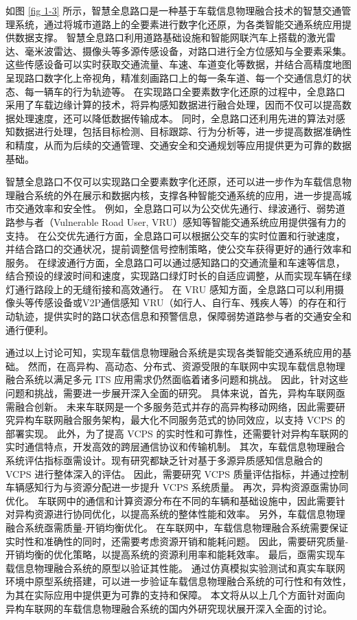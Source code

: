 如图 \ref{fig 1-3} 所示，智慧全息路口是一种基于车载信息物理融合技术的智慧交通管理系统，通过将城市道路上的全要素进行数字化还原，为各类智能交通系统应用提供数据支撑。
智慧全息路口利用道路基础设施和智能网联汽车上搭载的激光雷达、毫米波雷达、摄像头等多源传感设备，对路口进行全方位感知与全要素采集。
这些传感设备可以实时获取交通流量、车速、车道变化等数据，并结合高精度地图呈现路口数字化上帝视角，精准刻画路口上的每一条车道、每一个交通信息灯的状态、每一辆车的行为轨迹等。
在实现路口全要素数字化还原的过程中，全息路口采用了车载边缘计算的技术，将异构感知数据进行融合处理，因而不仅可以提高数据处理速度，还可以降低数据传输成本。
同时，全息路口还利用先进的算法对感知数据进行处理，包括目标检测、目标跟踪、行为分析等，进一步提高数据准确性和精度，从而为后续的交通管理、交通安全和交通规划等应用提供更为可靠的数据基础。

智慧全息路口不仅可以实现路口全要素数字化还原，还可以进一步作为车载信息物理融合系统的外在展示和数据内核，支撑各种智能交通系统的应用，进一步提高城市交通效率和安全性。
例如，全息路口可以为公交优先通行、绿波通行、弱势道路参与者（Vulnerable Road User, VRU）感知等智能交通系统应用提供强有力的支持。
在公交优先通行方面，全息路口可以根据公交车的实时位置和行驶速度，并结合路口的交通状况，提前调整信号控制策略，使公交车获得更好的通行效率和服务。
在绿波通行方面，全息路口可以通过感知路口的交通流量和车速等信息，结合预设的绿波时间和速度，实现路口绿灯时长的自适应调整，从而实现车辆在绿灯通行路段上的无缝衔接和高效通行。
在 VRU 感知方面，全息路口可以利用摄像头等传感设备或V2P通信感知 VRU（如行人、自行车、残疾人等）的存在和行动轨迹，提供实时的路口状态信息和预警信息，保障弱势道路参与者的交通安全和通行便利。

通过以上讨论可知，实现车载信息物理融合系统是实现各类智能交通系统应用的基础。
然而，在高异构、高动态、分布式、资源受限的车联网中实现车载信息物理融合系统以满足多元 ITS 应用需求仍然面临着诸多问题和挑战。
因此，针对这些问题和挑战，需要进一步展开深入全面的研究。
具体来说，首先，异构车联网亟需融合创新。
未来车联网是一个多服务范式并存的高异构移动网络，因此需要研究异构车联网融合服务架构，最大化不同服务范式的协同效应，以支持 VCPS 的部署实现。
此外，为了提高 VCPS 的实时性和可靠性，还需要针对异构车联网的实时通信特点，开发高效的跨层通信协议和传输机制。
其次，车载信息物理融合系统评估指标亟需设计。现有研究都缺乏针对基于多源异质感知信息融合的 VCPS 进行整体深入的评估。
因此，需要研究 VCPS 质量评估指标，并通过控制车辆感知行为与资源分配进一步提升 VCPS 系统质量。
再次，异构资源亟需协同优化。
车联网中的通信和计算资源分布在不同的车辆和基础设施中，因此需要针对异构资源进行协同优化，以提高系统的整体性能和效率。
另外，车载信息物理融合系统亟需质量-开销均衡优化。
在车联网中，车载信息物理融合系统需要保证实时性和准确性的同时，还需要考虑资源开销和能耗问题。
因此，需要研究质量-开销均衡的优化策略，以提高系统的资源利用率和能耗效率。
最后，亟需实现车载信息物理融合系统的原型以验证其性能。
通过仿真模拟实验测试和真实车联网环境中原型系统搭建，可以进一步验证车载信息物理融合系统的可行性和有效性，为其在实际应用中提供更为可靠的支持和保障。
本文将从以上几个方面针对面向异构车联网的车载信息物理融合系统的国内外研究现状展开深入全面的讨论。

